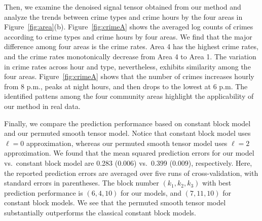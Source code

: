 \documentclass[12pt]{article}
\theoremstyle{definition}
\begin{document}
Then, we examine the denoised signal tensor obtained from our method and analyze the trends between crime types and crime hours by the four areas in Figure~\ref{fig:area}(b). Figure~\ref{fig:crimeA} shows the averaged log counts of crimes according to crime types and crime hours by four areas. We find that the major difference among four areas is the crime rates. Area 4 has the highest crime rates,  and the crime rates monotonically decrease from Area 4 to Area 1. The variation in crime rates across hour and type, nevertheless, exhibits similarity among the four areas. Figure~\ref{fig:crimeA} shows that the number of crimes increases hourly from 8 p.m., peaks at night hours, and then drops to the lowest at 6 p.m. The identified pattens among the four community areas highlight the applicability of our method in real data.

         

Finally, we compare the prediction performance based on constant block model and our permuted smooth tensor model. Notice that constant block model uses $\ell=0$ approximation, whereas our permuted smooth tensor model uses $\ell=2$ approximation. We found that the mean squared prediction errors for our model vs.\ constant block model are 0.283 (0.006) vs.\ 0.399 (0.009), respectively. Here, the reported prediction errors are averaged over five runs of cross-validation, with standard errors in parentheses. The block number $(k_1,k_2,k_3)$ with best prediction performance is $(6,4,10)$ for our models, and $(7,11,10)$ for constant block models. 
We see that the permuted smooth tensor model substantially outperforms the classical constant block models. %
\end{document}
